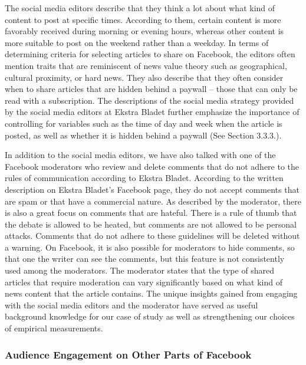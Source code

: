 \documentclass[
]{article}
\begin{document}
The social media editors describe that they think a lot about what kind
of content to post at specific times. According to them, certain content
is more favorably received during morning or evening hours, whereas
other content is more suitable to post on the weekend rather than a
weekday. In terms of determining criteria for selecting articles to
share on Facebook, the editors often mention traits that are reminiscent
of news value theory such as geographical, cultural proximity, or hard
news. They also describe that they often consider when to share articles
that are hidden behind a paywall -- those that can only be read with a
subscription. The descriptions of the social media strategy provided by
the social media editors at Ekstra Bladet further emphasize the
importance of controlling for variables such as the time of day and week
when the article is posted, as well as whether it is hidden behind a
paywall (See Section 3.3.3.).

In addition to the social media editors, we have also talked with one of
the Facebook moderators who review and delete comments that do not
adhere to the rules of communication according to Ekstra Bladet.
According to the written description on Ekstra Bladet's Facebook page,
they do not accept comments that are spam or that have a commercial
nature. As described by the moderator, there is also a great focus on
comments that are hateful. There is a rule of thumb that the debate is
allowed to be heated, but comments are not allowed to be personal
attacks. Comments that do not adhere to these guidelines will be deleted
without a warning. On Facebook, it is also possible for moderators to
hide comments, so that one the writer can see the comments, but this
feature is not consistently used among the moderators. The moderator
states that the type of shared articles that require moderation can vary
significantly based on what kind of news content that the article
contains. The unique insights gained from engaging with the social media
editors and the moderator have served as useful background knowledge for
our case of study as well as strengthening our choices of empirical
measurements.

\hypertarget{audience-engagement-on-other-parts-of-facebook}{%
\subsubsection{Audience Engagement on Other Parts of
Facebook}\label{audience-engagement-on-other-parts-of-facebook}}
\end{document}

